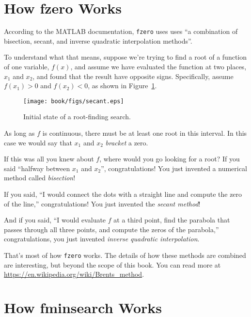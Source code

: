 

\section{How fzero Works}
\label{howfzero}

According to the MATLAB documentation, {\tt fzero} uses uses ``a combination of bisection, secant, and inverse quadratic interpolation methods''.


To understand what that means, suppose we're trying to find a root of a function of one variable, $f(x)$, and assume we have evaluated the function at two places, $x_1$ and $x_2$, and found that the result have opposite signs.  Specifically, assume $f(x_1) > 0$ and $f(x_2) < 0$, as shown in Figure~\ref{fig:secant}.

\begin{figure}[ht]
\centerline{\texttt{[image: book/figs/secant.eps]}}
\caption{Initial state of a root-finding search.}
\label{fig:secant}
\end{figure}

As long as $f$ is continuous, there must be at least one root in this interval.  
In this case we would say that $x_1$ and $x_2$ \emph{bracket} a zero.


If this was all you knew about $f$, where would you go looking for
a root?  If you said ``halfway between $x_1$ and $x_2$'',
congratulations!  You just invented a numerical method called
\emph{bisection}!

If you said, ``I would connect the dots with a straight line
and compute the zero of the line,''
congratulations!  You just invented the \emph{secant method}!

And if you said, ``I would evaluate $f$ at a third point, find the
parabola that passes through all three points, and compute the zeros
of the parabola,'' congratulations, you just invented 
\emph{inverse quadratic interpolation}.

That's most of how {\tt fzero} works.  The details of how these methods are combined are interesting, but beyond the scope of this book.  You can read more at \url{https://en.wikipedia.org/wiki/Brents_method}.  


\section{How fminsearch Works}
\label{howfminsearch}

